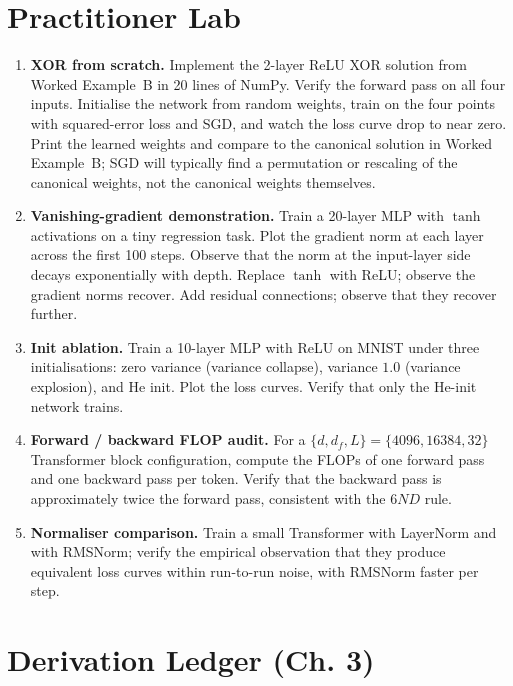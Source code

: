 \section{Practitioner Lab}

\begin{enumerate}
  \item \textbf{XOR from scratch.} Implement the 2-layer ReLU
        XOR solution from Worked Example~B in 20 lines of
        NumPy. Verify the forward pass on all four inputs.
        Initialise the network from random weights, train on
        the four points with squared-error loss and SGD, and
        watch the loss curve drop to near zero. Print the
        learned weights and compare to the canonical solution
        in Worked Example~B; SGD will typically find a
        permutation or rescaling of the canonical weights, not
        the canonical weights themselves.
  \item \textbf{Vanishing-gradient demonstration.} Train a
        20-layer MLP with $\tanh$ activations on a tiny
        regression task. Plot the gradient norm at each layer
        across the first 100 steps. Observe that the norm at
        the input-layer side decays exponentially with depth.
        Replace $\tanh$ with ReLU; observe the gradient norms
        recover. Add residual connections; observe that they
        recover further.
  \item \textbf{Init ablation.} Train a 10-layer MLP with ReLU
        on MNIST under three initialisations: zero variance
        (variance collapse), variance $1.0$ (variance
        explosion), and He init. Plot the loss curves. Verify
        that only the He-init network trains.
  \item \textbf{Forward / backward FLOP audit.} For a
        $\{d, d_f, L\} = \{4096, 16384, 32\}$ Transformer block
        configuration, compute the FLOPs of one forward pass
        and one backward pass per token. Verify that the
        backward pass is approximately twice the forward pass,
        consistent with the $6ND$ rule.
  \item \textbf{Normaliser comparison.} Train a small Transformer
        with LayerNorm and with RMSNorm; verify the empirical
        observation that they produce equivalent loss curves
        within run-to-run noise, with RMSNorm faster per step.
\end{enumerate}

\section*{Derivation Ledger (Ch. 3)}

